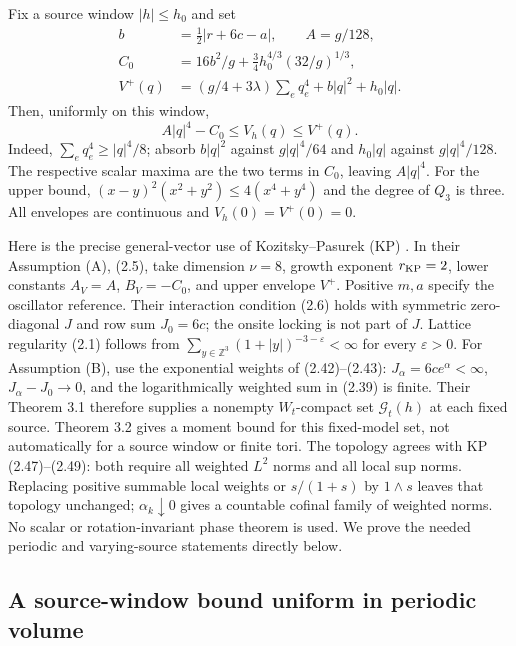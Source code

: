 \documentclass[11pt]{article}
\numberwithin{equation}{section}
\theoremstyle{definition}
\newcommand{\Z}{\mathbb Z}
\newcommand{\cG}{\mathcal G}
\begin{document}
Fix a source window $|h|\leq h_0$ and set
\begin{align}
 b&=\tfrac12|r+6c-a|,\qquad A=g/128,\nonumber\\
 C_0&=16b^2/g+\tfrac34 h_0^{4/3}(32/g)^{1/3},\nonumber\\
 V^+(q)&=(g/4+3\lambda)\sum_e q_e^4+b|q|^2+h_0|q|.
 \label{eq:dlr-envelope-constants}
\end{align}
Then, uniformly on this window,
\begin{equation}
 A|q|^4-C_0\leq V_h(q)\leq V^+(q).
 \label{eq:dlr-potential-envelope}
\end{equation}
Indeed, $\sum_e q_e^4\geq |q|^4/8$; absorb $b|q|^2$ against
$g|q|^4/64$ and $h_0|q|$ against $g|q|^4/128$.  The respective scalar
maxima are the two terms in $C_0$, leaving $A|q|^4$.  For the upper
bound, $(x-y)^2(x^2+y^2)\leq4(x^4+y^4)$ and the degree of $Q_3$ is
three.  All envelopes are continuous and $V_h(0)=V^+(0)=0$.

Here is the precise general-vector use of Kozitsky--Pasurek (KP)
\cite{KP}.  In their Assumption (A), (2.5), take dimension $\nu=8$,
growth exponent $r_{\rm KP}=2$, lower constants $A_V=A$, $B_V=-C_0$,
and upper envelope $V^+$.  Positive $m,a$ specify the oscillator reference.
Their interaction condition (2.6) holds with symmetric zero-diagonal $J$
and row sum $J_0=6c$; the onsite locking is not part of $J$.  Lattice
regularity (2.1) follows from
$\sum_{y\in\Z^3}(1+|y|)^{-3-\varepsilon}<\infty$ for every
$\varepsilon>0$.  For Assumption (B), use the exponential weights of
(2.42)--(2.43): $J_\alpha=6ce^\alpha<\infty$,
$J_\alpha-J_0\to0$, and the logarithmically weighted sum in (2.39) is
finite.  Their Theorem 3.1 therefore supplies a nonempty $W_t$-compact set
$\cG_t(h)$ at each fixed source.  Theorem 3.2 gives a moment bound for
this fixed-model set, not automatically for a source window or finite tori.
The topology agrees with KP (2.47)--(2.49): both require all weighted
$L^2$ norms and all local sup norms.  Replacing positive summable local
weights or $s/(1+s)$ by $1\wedge s$ leaves that topology unchanged;
$\alpha_k\downarrow0$ gives a countable cofinal family of weighted norms.
No scalar or rotation-invariant phase theorem is used.  We prove the needed
periodic and varying-source statements directly below.

\subsection{A source-window bound uniform in periodic volume}
\label{sec:dlr-periodic-moment}
\end{document}

